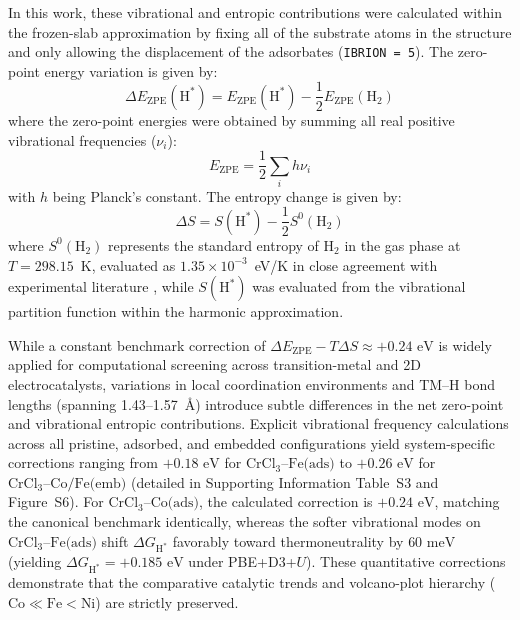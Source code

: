 \documentclass[journal=jacsat,manuscript=article]{achemso}
\begin{document}
{\color{revcolor}%
  In this work, these vibrational and entropic contributions were calculated within the frozen-slab approximation by fixing all of the substrate atoms in the structure and only allowing the displacement of the adsorbates (\texttt{IBRION = 5}). The zero-point energy variation is given by:
  \begin{equation}
    \Delta E_{\mathrm{ZPE}}(\mathrm{H}^{*}) = E_{\mathrm{ZPE}}(\mathrm{H}^{*}) - \frac{1}{2}E_{\mathrm{ZPE}}(\mathrm{H}_{2})
  \end{equation}
  where the zero-point energies were obtained by summing all real positive vibrational frequencies ($\nu_i$):
  \begin{equation}
    E_{\mathrm{ZPE}} = \frac{1}{2} \sum_{i}h\nu_{i}
  \end{equation}
  with $h$ being Planck's constant. The entropy change is given by:
  \begin{equation}
    \Delta S = S(\mathrm{H}^{*}) - \frac{1}{2}S^{0}(\mathrm{H}_{2})
  \end{equation}
  where $S^{0}(\mathrm{H}_{2})$ represents the standard entropy of $\mathrm{H}_2$ in the gas phase at $T=298.15$~K, evaluated as $1.35 \times 10^{-3}$~eV/K in close agreement with experimental literature \cite{ZUTTEL200324,Norskov_2005}, while $S(\mathrm{H}^{*})$ was evaluated from the vibrational partition function within the harmonic approximation.

  While a constant benchmark correction of $\Delta E_{\mathrm{ZPE}} - T\Delta S \approx +0.24\text{ eV}$ \cite{Norskov_2005} is widely applied for computational screening across transition-metal and 2D electrocatalysts, variations in local coordination environments and TM--H bond lengths (spanning 1.43--1.57~\AA) introduce subtle differences in the net zero-point and vibrational entropic contributions. Explicit vibrational frequency calculations across all pristine, adsorbed, and embedded configurations yield system-specific corrections ranging from $+0.18\text{ eV}$ for $\text{CrCl}_3\text{--Fe(ads)}$ to $+0.26\text{ eV}$ for $\text{CrCl}_3\text{--Co/Fe(emb)}$ (detailed in Supporting Information Table~S3 and Figure~S6). For $\text{CrCl}_3\text{--Co(ads)}$, the calculated correction is $+0.24\text{ eV}$, matching the canonical benchmark identically, whereas the softer vibrational modes on $\text{CrCl}_3\text{--Fe(ads)}$ shift $\Delta G_{\mathrm{H}^*}$ favorably toward thermoneutrality by $60\text{ meV}$ (yielding $\Delta G_{\mathrm{H}^*} = +0.185\text{ eV}$ under PBE+D3+$U$). These quantitative corrections demonstrate that the comparative catalytic trends and volcano-plot hierarchy ($\text{Co} \ll \text{Fe} < \text{Ni}$) are strictly preserved.
\par}
\end{document}

